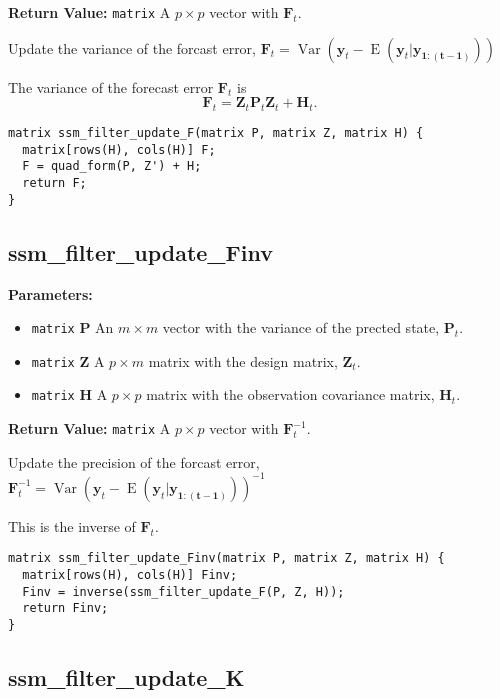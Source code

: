 \documentclass[]{book}
\providecommand{\tightlist}{%
  \setlength{\itemsep}{0pt}\setlength{\parskip}{0pt}}
\DeclareMathOperator{\E}{E}
\DeclareMathOperator{\Var}{Var}
\newcommand{\mat}[1]{\boldsymbol{#1}}
\renewcommand{\vec}[1]{\boldsymbol{#1}}
\begin{document}
\textbf{Return Value:} \texttt{matrix} A \(p \times p\) vector with
\(\mat{F}_t\).

Update the variance of the forcast error,
\(\mat{F}_t = \Var(\vec{y}_t - \E(\vec{y}_t | \vec{y_{1:(t - 1)}}))\)

The variance of the forecast error \(\mat{F}_t\) is \[
\mat{F}_t = \mat{Z}_t \mat{P}_t \mat{Z}_t + \mat{H}_t .
\]

\begin{verbatim}
matrix ssm_filter_update_F(matrix P, matrix Z, matrix H) {
  matrix[rows(H), cols(H)] F;
  F = quad_form(P, Z') + H;
  return F;
}
\end{verbatim}

\subsection{ssm\_filter\_update\_Finv}\label{ssmux5ffilterux5fupdateux5ffinv}

\textbf{Parameters:}

\begin{itemize}
\tightlist
\item
  \texttt{matrix} \textbf{P} An \(m \times m\) vector with the variance
  of the prected state, \(\mat{P}_t\).
\item
  \texttt{matrix} \textbf{Z} A \(p \times m\) matrix with the design
  matrix, \(\mat{Z}_t\).
\item
  \texttt{matrix} \textbf{H} A \(p \times p\) matrix with the
  observation covariance matrix, \(\mat{H}_t\).
\end{itemize}

\textbf{Return Value:} \texttt{matrix} A \(p \times p\) vector with
\(\mat{F}^{-1}_t\).

Update the precision of the forcast error,
\(\mat{F}^{-1}_t = \Var(\vec{y}_t - \E(\vec{y}_t | \vec{y_{1:(t - 1)}}))^{-1}\)

This is the inverse of \(\mat{F}_t\).

\begin{verbatim}
matrix ssm_filter_update_Finv(matrix P, matrix Z, matrix H) {
  matrix[rows(H), cols(H)] Finv;
  Finv = inverse(ssm_filter_update_F(P, Z, H));
  return Finv;
}
\end{verbatim}

\subsection{ssm\_filter\_update\_K}\label{ssmux5ffilterux5fupdateux5fk}
\end{document}
